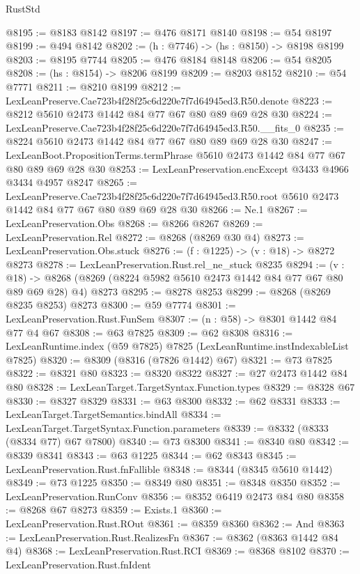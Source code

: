 \begin{lexlean}{RustStd}
\begin{coremodule}
@8195 := @8183 @8142
@8197 := @476 @8171 @8140
@8198 := @54 @8197
@8199 := @494 @8142
@8202 := (h : @7746) -> (hs : @8150) -> @8198 @8199
@8203 := @8195 @7744
@8205 := @476 @8184 @8148
@8206 := @54 @8205
@8208 := (hs : @8154) -> @8206 @8199
@8209 := @8203 @8152
@8210 := @54 @7771
@8211 := @8210 @8199
@8212 := LexLeanPreserve.Cae723b4f28f25c6d220e7f7d64945ed3.R50.denote
@8223 := @8212 @5610 @2473 @1442 @84 @77 @67 @80 @89 @69 @28 @30
@8224 := LexLeanPreserve.Cae723b4f28f25c6d220e7f7d64945ed3.R50.__fits_0
@8235 := @8224 @5610 @2473 @1442 @84 @77 @67 @80 @89 @69 @28 @30
@8247 := LexLeanBoot.PropositionTerms.termPhrase @5610 @2473 @1442 @84 @77 @67 @80 @89 @69 @28 @30
@8253 := LexLeanPreservation.encExcept @3433 @4966 @3434 @4957 @8247
@8265 := LexLeanPreserve.Cae723b4f28f25c6d220e7f7d64945ed3.R50.root
    @5610
    @2473
    @1442
    @84
    @77
    @67
    @80
    @89
    @69
    @28
    @30
@8266 := Ne.{1}
@8267 := LexLeanPreservation.Obs
@8268 := @8266 @8267
@8269 := LexLeanPreservation.Rel
@8272 := @8268 (@8269 @30 @4)
@8273 := LexLeanPreservation.Obs.stuck
@8276 := (f : @1225) -> (v : @18) -> @8272 @8273
@8278 := LexLeanPreservation.Rust.rel_ne_stuck @8235
@8294 := (v : @18) ->
  @8268 (@8269 (@8224 @5982 @5610 @2473 @1442 @84 @77 @67 @80 @89 @69 @28) @4) @8273
@8295 := @8278 @8253
@8299 := @8268 (@8269 @8235 @8253) @8273
@8300 := @59 @7774
@8301 := LexLeanPreservation.Rust.FunSem
@8307 := (n : @58) -> @8301 @1442 @84 @77 @4 @67
@8308 := @63 @7825
@8309 := @62 @8308
@8316 := LexLeanRuntime.index (@59 @7825) @7825 (LexLeanRuntime.instIndexableList @7825)
@8320 := @8309 (@8316 (@7826 @1442) @67)
@8321 := @73 @7825
@8322 := @8321 @80
@8323 := @8320 @8322
@8327 := @27 @2473 @1442 @84 @80
@8328 := LexLeanTarget.TargetSyntax.Function.types
@8329 := @8328 @67
@8330 := @8327 @8329
@8331 := @63 @8300
@8332 := @62 @8331
@8333 := LexLeanTarget.TargetSemantics.bindAll
@8334 := LexLeanTarget.TargetSyntax.Function.parameters
@8339 := @8332 (@8333 (@8334 @77) @67 @7800)
@8340 := @73 @8300
@8341 := @8340 @80
@8342 := @8339 @8341
@8343 := @63 @1225
@8344 := @62 @8343
@8345 := LexLeanPreservation.Rust.fnFallible
@8348 := @8344 (@8345 @5610 @1442)
@8349 := @73 @1225
@8350 := @8349 @80
@8351 := @8348 @8350
@8352 := LexLeanPreservation.RunConv
@8356 := @8352 @6419 @2473 @84 @80
@8358 := @8268 @67 @8273
@8359 := Exists.{1}
@8360 := LexLeanPreservation.Rust.ROut
@8361 := @8359 @8360
@8362 := And
@8363 := LexLeanPreservation.Rust.RealizesFn
@8367 := @8362 (@8363 @1442 @84 @4)
@8368 := LexLeanPreservation.Rust.RCI
@8369 := @8368 @8102
@8370 := LexLeanPreservation.Rust.fnIdent

\end{coremodule}
\end{lexlean}
